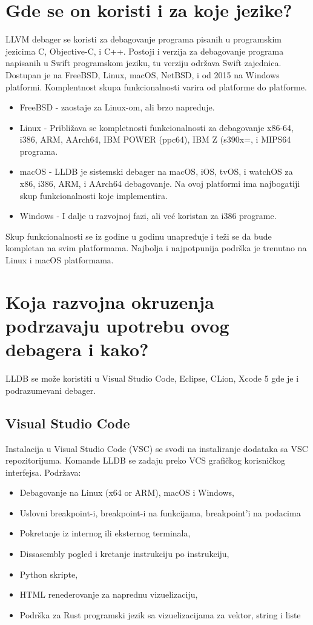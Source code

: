\documentclass[a4paper]{article}
\begin{document}
\section{Gde se on koristi i za koje jezike? }
\label{sec: Gde se on koristi i za koje jezike?}
LLVM debager se koristi za debagovanje programa pisanih u programskim jezicima C, Objective-C, i C++. Postoji i verzija za debagovanje programa napisanih u Swift programskom jeziku, tu verziju održava Swift zajednica. 
Dostupan je na FreeBSD, Linux, macOS, NetBSD, i od 2015 na Windows platformi. Komplentnost skupa funkcionalnosti varira od platforme do platforme.
\begin{itemize}
\item FreeBSD - zaostaje za Linux-om, ali brzo napreduje.
\item Linux - Približava se kompletnosti funkcionalnosti za debagovanje x86-64, i386, ARM, AArch64, IBM POWER (ppc64), IBM Z (s390x=, i MIPS64 programa.
\item macOS - LLDB je sistemski debager na macOS, iOS, tvOS, i watchOS za x86, i386, ARM, i AArch64 debagovanje. Na ovoj platformi ima najbogatiji skup funkcionalnosti koje implementira.
\item Windows - I dalje u razvojnoj fazi, ali već koristan za i386 programe.
\end{itemize}
Skup funkcionalnosti se iz godine u godinu unapređuje i teži se da bude kompletan na svim platformama. Najbolja i najpotpunija podrška je trenutno na Linux i macOS platformama.

\section{Koja razvojna okruzenja podrzavaju upotrebu ovog debagera i kako?}
\label{subsec:Koja razvojna okruzenja podrzavaju upotrebu ovog debagera i kako?}

LLDB se može koristiti u Visual Studio Code, Eclipse, CLion, Xcode 5 gde je i podrazumevani debager. 

\subsection{Visual Studio Code}
Instalacija u Visual Studio Code (VSC) se svodi na instaliranje dodataka sa VSC repozitorijuma. Komande LLDB se zadaju preko VCS grafičkog korisničkog interfejsa. 
Podržava:
\begin{itemize}
\item Debagovanje na Linux (x64 or ARM), macOS i Windows,
\item Uslovni breakpoint-i, breakpoint-i na funkcijama, breakpoint'i na podacima
\item Pokretanje iz internog ili eksternog terminala,
\item Dissasembly pogled i kretanje instrukciju po instrukciju,
\item Python skripte,
\item HTML renederovanje za naprednu vizuelizaciju,
\item Podrška za Rust programski jezik sa vizuelizacijama za vektor, string i liste
\end{itemize}
\end{document}
